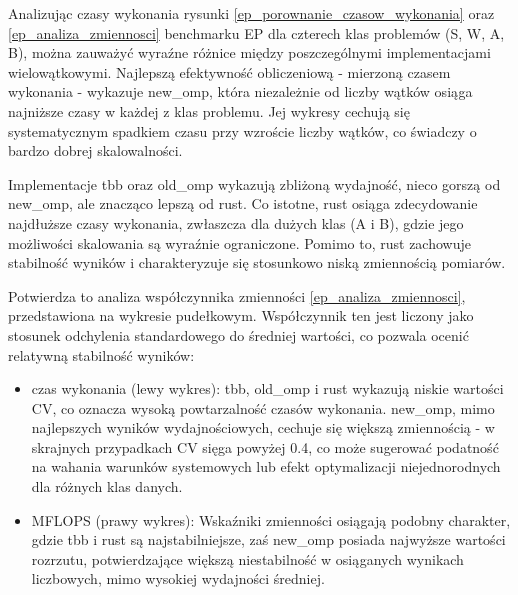 Analizując czasy wykonania rysunki \ref{ep_porownanie_czasow_wykonania} oraz \ref{ep_analiza_zmiennosci} benchmarku EP dla czterech klas problemów (S, W, A, B), można zauważyć wyraźne różnice między poszczególnymi implementacjami wielowątkowymi. Najlepszą efektywność obliczeniową - mierzoną czasem wykonania - wykazuje new\_omp, która niezależnie od liczby wątków osiąga najniższe czasy w każdej z klas problemu. Jej wykresy cechują się systematycznym spadkiem czasu przy wzroście liczby wątków, co świadczy o bardzo dobrej skalowalności.

Implementacje tbb oraz old\_omp wykazują zbliżoną wydajność, nieco gorszą od new\_omp, ale znacząco lepszą od rust. Co istotne, rust osiąga zdecydowanie najdłuższe czasy wykonania, zwłaszcza dla dużych klas (A i B), gdzie jego możliwości skalowania są wyraźnie ograniczone. Pomimo to, rust zachowuje stabilność wyników i charakteryzuje się stosunkowo niską zmiennością pomiarów.

Potwierdza to analiza współczynnika zmienności  \ref{ep_analiza_zmiennosci}, przedstawiona na wykresie pudełkowym. Współczynnik ten jest liczony jako stosunek odchylenia standardowego do średniej wartości, co pozwala ocenić relatywną stabilność wyników:
\begin{itemize}
    \item czas wykonania (lewy wykres): tbb, old\_omp i rust wykazują niskie wartości CV, co oznacza wysoką powtarzalność czasów wykonania. new\_omp, mimo najlepszych wyników wydajnościowych, cechuje się większą zmiennością - w skrajnych przypadkach CV sięga powyżej 0.4, co może sugerować podatność na wahania warunków systemowych lub efekt optymalizacji niejednorodnych dla różnych klas danych.
    \item MFLOPS (prawy wykres): Wskaźniki zmienności osiągają podobny charakter, gdzie tbb i rust są najstabilniejsze, zaś new\_omp posiada najwyższe wartości rozrzutu, potwierdzające większą niestabilność w osiąganych wynikach liczbowych, mimo wysokiej wydajności średniej.
\end{itemize}


